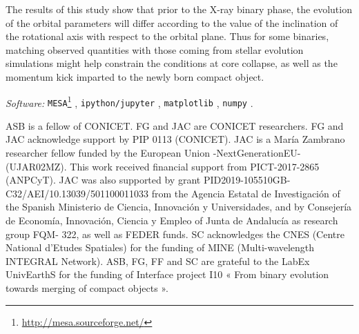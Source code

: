 \documentclass{aa}
\begin{document}
The results of this study show that prior to the X-ray binary phase, the evolution of the orbital parameters will differ according to the
value of the inclination of the rotational axis with respect to the orbital plane. Thus for some binaries, matching observed quantities
with those coming from stellar evolution simulations might help constrain the conditions at core collapse, as well as the momentum kick
imparted to the newly born compact object.

{\em Software:} {\tt MESA}\footnote{\url{http://mesa.sourceforge.net/}} \citep{paxton2011,paxton2013,paxton2015,paxton2018,paxton2019},
{\tt ipython/jupyter} \citep{jupyter}, {\tt matplotlib} \citep{hunter2007}, {\tt numpy} \citep{harris2020}.

\begin{acknowledgements}

ASB is a fellow of CONICET. FG and JAC are CONICET researchers. FG and JAC acknowledge support by PIP 0113 (CONICET). JAC is a Mar\'ia
Zambrano researcher fellow funded by the European Union -NextGenerationEU- (UJAR02MZ). This work received financial support from
PICT-2017-2865 (ANPCyT). JAC was also supported by grant PID2019-105510GB-C32/AEI/10.13039/501100011033 from the Agencia Estatal de
Investigaci\'on of the Spanish Ministerio de Ciencia, Innovaci\'on y Universidades, and by Consejer\'ia de Econom\'ia, Innovaci\'on,
Ciencia y Empleo of Junta de Andaluc\'ia as research group FQM- 322, as well as FEDER funds. SC acknowledges the CNES (Centre National
d’Etudes Spatiales) for the funding of MINE (Multi-wavelength INTEGRAL Network). ASB, FG, FF and SC are grateful to the LabEx UnivEarthS
for the funding of Interface project I10 « From binary evolution towards merging of compact objects ».

\end{acknowledgements}



\end{document}

